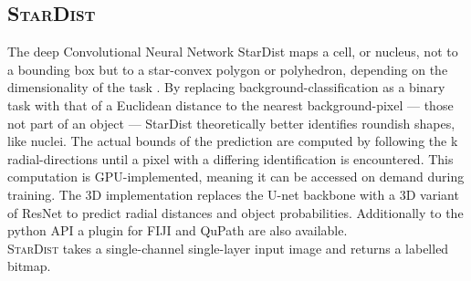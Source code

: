 \subsection*{\color{stardist}\textsc{StarDist}}
The deep Convolutional Neural Network StarDist maps a cell, or nucleus, not to a bounding box but to a star-convex polygon or polyhedron, depending on the dimensionality of the task \cite{schmidt_cell_2018} \cite{weigert_star-convex_2020} \cite{weigert_nuclei_2022}. By replacing background-classification as a binary task with that of a Euclidean distance to the nearest background-pixel --- those not part of an object ---  StarDist theoretically better identifies roundish shapes, like nuclei. The actual bounds of the prediction are computed by following the k radial-directions until a pixel with a differing identification is encountered. This computation is GPU-implemented, meaning it can be accessed on demand during training. The 3D implementation replaces the U-net backbone with a 3D variant of ResNet to predict radial distances and object probabilities. Additionally to the python API a plugin for FIJI and QuPath are also available.\\
\textsc{StarDist} takes a single-channel single-layer input image and returns a labelled bitmap.